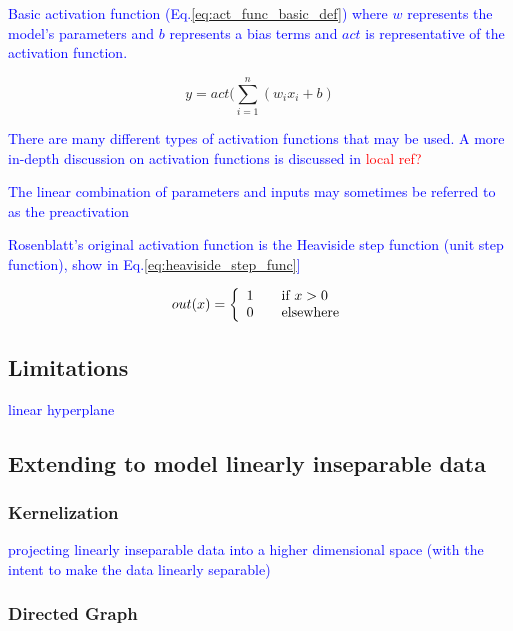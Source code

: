 \textcolor{blue}{Basic activation function (Eq.\ref{eq:act_func_basic_def}) where $w$ represents the model's parameters and $b$ represents a bias terms and $act$ is representative of the activation function.}

\begin{equation}
{y = act (\sum_{i=1}^{n}(w_i x_i + b)}
\label{eq:act_func_basic_def}
\end{equation}

\textcolor{blue}{There are many different types of activation functions that may be used. A more in-depth discussion on activation functions is discussed in \textcolor{red}{local ref?}}

\textcolor{blue}{The linear combination of parameters and inputs may sometimes be referred to as the preactivation}

\textcolor{blue}{Rosenblatt's original activation function is the {Heaviside step function} ({unit step function}), show in Eq.\ref{eq:heaviside_step_func}]}

\begin{equation}
{out(x) = \left\{
	\begin{array}{ll}
	1 & \quad $if $ x > 0 \\
	0 & \quad $elsewhere$
	\end{array}
	\right.}
\label{eq:heaviside_step_func}
\end{equation}



\subsection{Limitations}

\textcolor{blue}{linear hyperplane}

\subsection{Extending to model linearly inseparable data}

\subsubsection{Kernelization}

\textcolor{blue}{projecting linearly inseparable data into a higher dimensional space (with the intent to make the data linearly separable)}

\subsubsection{Directed Graph}

